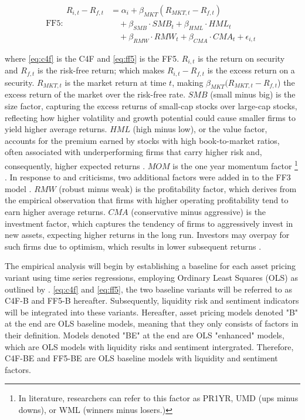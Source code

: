 \begin{equation}
    \label{eq:ff5}
    \text{FF5:} 
    \begin{split}
        R_{i,t} - R_{f,t} &= \alpha_i + \beta_{MKT} (R_{MKT,t} - R_{f,t}) \\
        &\quad + \beta_{SMB} \cdot SMB_t + \beta_{HML} \cdot HML_t \\
        &\quad + \beta_{RMW} \cdot RMW_t + \beta_{CMA} \cdot CMA_t + \epsilon_{i,t}
    \end{split}
\end{equation}




where \cref{eq:c4f} is the C4F and \cref{eq:ff5} is the FF5. $R_{i,t}$ is the return on security and $R_{f,t}$ is the risk-free return; which makes $R_{i,t} - R_{f,t}$ is the excess return on a security. \( R_{MKT,t} \) is the market return at time \(t\), making \(\beta_{MKT} (R_{MKT,t} - R_{f,t}\))  the excess return of the market over the risk-free rate. $SMB$ (small minus big) is the size factor, capturing the excess returns of small-cap stocks over large-cap stocks, reflecting how higher volatility and growth potential could cause smaller firms to yield higher average returns. $HML$ (high minus low), or the value factor, accounts for the premium earned by stocks with high book-to-market ratios, often associated with underperforming firms that carry higher risk and, consequently, higher expected returns \cite{ff3_1993}. $MOM$ is the one year momentum factor \footnote{In literature, researchers can refer to this factor as PR1YR, UMD (ups minus downs), or WML (winners minus losers.)} \cite{cahart_1997}. In response to  and  criticisms, two additional factors were added in to the FF3 model \cite{ff5_2015}. $RMW$ (robust minus weak) is the profitability factor, which derives from the empirical observation that firms with higher operating profitability tend to earn higher average returns. $CMA$ (conservative minus aggressive) is the investment factor, which captures the tendency of firms to aggressively invest in new assets, expecting higher returns in the long run. Investors may overpay for such firms due to optimism, which results in lower subsequent returns \cite{titman_2004}.

The empirical analysis will begin by establishing a baseline for each asset pricing variant using time series regressions, employing Ordinary Least Squares (OLS) as outlined by . \cref{eq:c4f} and \cref{eq:ff5}, the two baseline variants will be referred to as C4F-B and FF5-B hereafter. Subsequently, liquidity risk and sentiment indicators will be integrated into these variants. Hereafter, asset pricing models denoted "B" at the end are OLS baseline models, meaning that they only consists of factors in their definition. Models denoted "BE" at the end are OLS "enhanced" models, which are OLS models with liquidity risks and sentiment intergrated. Therefore, C4F-BE and FF5-BE are OLS baseline models with liquidity and sentiment factors.


